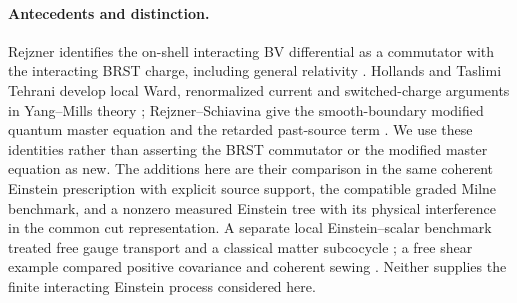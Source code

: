\documentclass[11pt]{article}
\theoremstyle{remark}
\begin{document}
\paragraph{Antecedents and distinction.}
Rejzner identifies the on-shell interacting BV differential as a commutator with the interacting BRST charge, including general relativity \cite{Rejzner,BFR}. Hollands and Taslimi Tehrani develop local Ward, renormalized current and switched-charge arguments in Yang--Mills theory \cite{Hollands,TT}; Rejzner--Schiavina give the smooth-boundary modified quantum master equation and the retarded past-source term \cite[Thm.~4.16, Lemma~5.1 and Sec.~5.4]{RS}. We use these identities rather than asserting the BRST commutator or the modified master equation as new. The additions here are their comparison in the same coherent Einstein prescription with explicit source support, the compatible graded Milne benchmark, and a nonzero measured Einstein tree with its physical interference in the common cut representation. A separate local Einstein--scalar benchmark treated free gauge transport and a classical matter subcocycle \cite{P19}; a free shear example compared positive covariance and coherent sewing \cite{P53}. Neither supplies the finite interacting Einstein process considered here.





\end{document}
